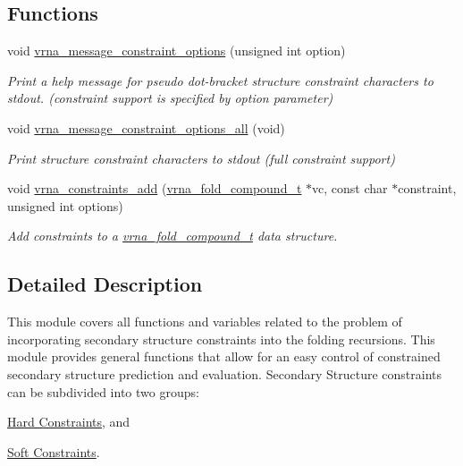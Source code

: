 \subsection*{Functions}
\begin{DoxyCompactItemize}
\item 
void \hyperlink{group__constraints_gaa1f20b53bf09ac2e6b0dbb13f7d89670}{vrna\-\_\-message\-\_\-constraint\-\_\-options} (unsigned int option)
\begin{DoxyCompactList}\small\item\em Print a help message for pseudo dot-\/bracket structure constraint characters to stdout. (constraint support is specified by option parameter) \end{DoxyCompactList}\item 
void \hyperlink{group__constraints_gaec7e13fa0465c2acc7a621d1aecb709f}{vrna\-\_\-message\-\_\-constraint\-\_\-options\-\_\-all} (void)
\begin{DoxyCompactList}\small\item\em Print structure constraint characters to stdout (full constraint support) \end{DoxyCompactList}\item 
void \hyperlink{group__constraints_ga35a401f680969a556858a8dd5f1d07cc}{vrna\-\_\-constraints\-\_\-add} (\hyperlink{group__fold__compound_ga1b0cef17fd40466cef5968eaeeff6166}{vrna\-\_\-fold\-\_\-compound\-\_\-t} $\ast$vc, const char $\ast$constraint, unsigned int options)
\begin{DoxyCompactList}\small\item\em Add constraints to a \hyperlink{group__fold__compound_ga1b0cef17fd40466cef5968eaeeff6166}{vrna\-\_\-fold\-\_\-compound\-\_\-t} data structure. \end{DoxyCompactList}\end{DoxyCompactItemize}


\subsection{Detailed Description}
This module covers all functions and variables related to the problem of incorporating secondary structure constraints into the folding recursions. This module provides general functions that allow for an easy control of constrained secondary structure prediction and evaluation. Secondary Structure constraints can be subdivided into two groups\-:


\begin{DoxyItemize}
\item \hyperlink{group__hard__constraints}{Hard Constraints}, and
\item \hyperlink{group__soft__constraints}{Soft Constraints}.
\end{DoxyItemize}

